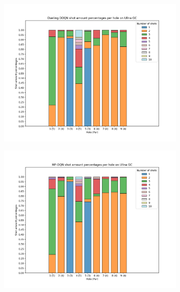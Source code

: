 \documentclass{kththesis}
\begin{document}
\begin{figure}
{\begin{subfigure}{0.3\paperwidth}
    \centering
    \includegraphics[width=0.3\paperwidth]{AgentPercentages/DDDQN_Shot_Percentages_Ullna.png} 
    \end{subfigure}
    \begin{subfigure}{0.3\paperwidth}
    \centering
    \includegraphics[width=0.3\paperwidth]{AgentPercentages/MPDQN_Shot_Percentages_Ullna.png} 
    \end{subfigure}
    }
    \makebox[\linewidth][c]{
    \begin{subfigure}{0.3\paperwidth}
    \centering

\end{subfigure}}
\end{figure}
\end{document}
